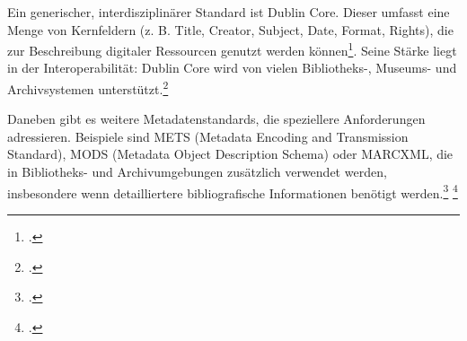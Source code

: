 \documentclass[12pt,a4paper]{report}
\begin{document}
  Ein generischer, interdisziplinärer Standard ist Dublin Core. Dieser umfasst eine Menge von Kernfeldern (z. B. Title, Creator, Subject, Date, Format, Rights), 
  die zur Beschreibung digitaler Ressourcen genutzt werden können\footcite[Vgl.][siehe The Elements]{dublincore_set}. 
  Seine Stärke liegt in der Interoperabilität: Dublin Core wird von vielen Bibliotheks-, Museums- und Archivsystemen unterstützt.\footcite[Vgl.][siehe 1.1. What is Metadata?]{dublincore_using}

  Daneben gibt es weitere Metadatenstandards, die speziellere Anforderungen adressieren. 
  Beispiele sind METS (Metadata Encoding and Transmission Standard), MODS (Metadata Object Description Schema) 
  oder MARCXML, die in Bibliotheks- und Archivumgebungen zusätzlich verwendet werden, 
  insbesondere wenn detailliertere bibliografische Informationen benötigt werden.\footcite[Vgl.][]{loc_mets} \footcite[Vgl.][]{loc_mods}  
  
\end{document}
